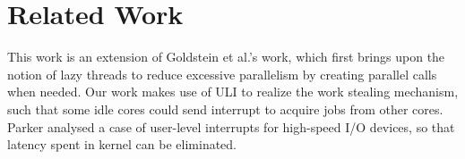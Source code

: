 \section{Related Work}

This work is an extension of Goldstein et al.'s work, which first brings upon the notion of lazy threads to reduce excessive parallelism by creating parallel calls when needed. Our work makes use of ULI to realize the work stealing mechanism, such that some idle cores could send interrupt to acquire jobs from other cores. Parker analysed a case of user-level interrupts for high-speed I/O devices, so that latency spent in kernel can be eliminated.

\lipsum[2-2]

